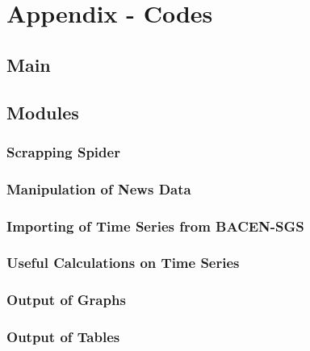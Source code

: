 \documentclass[cic,tc, english]{iiufrgs}
\begin{document}
    
\chapter{Appendix - Codes} \label{chapter_appendix}

\section{Main}

    

\section{Modules}

\subsection{Scrapping Spider}

    
    
\subsection{Manipulation of News Data}

    

\subsection{Importing of Time Series from BACEN-SGS}

    

\subsection{Useful Calculations on Time Series}

    

\subsection{Output of Graphs}

    

\subsection{Output of Tables}

    


 \label{chapter_bibliography}
\end{document}
